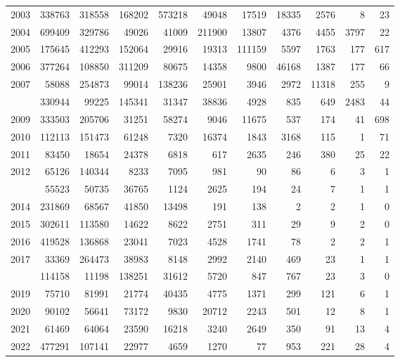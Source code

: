 \documentclass[
]{article}
\begin{document}
\begin{longtable}[t]{lrrrrrrrrrr}
2003 & 338763 & 318558 & 168202 & 573218 & 49048 & 17519 & 18335 & 2576 & 8 & 23\\
2004 & 699409 & 329786 & 49026 & 41009 & 211900 & 13807 & 4376 & 4455 & 3797 & 22\\
2005 & 175645 & 412293 & 152064 & 29916 & 19313 & 111159 & 5597 & 1763 & 177 & 617\\
2006 & 377264 & 108850 & 311209 & 80675 & 14358 & 9800 & 46168 & 1387 & 177 & 66\\
2007 & 58088 & 254873 & 99014 & 138236 & 25901 & 3946 & 2972 & 11318 & 255 & 9\\
\addlinespace
2008 & 330944 & 99225 & 145341 & 31347 & 38836 & 4928 & 835 & 649 & 2483 & 44\\
2009 & 333503 & 205706 & 31251 & 58274 & 9046 & 11675 & 537 & 174 & 41 & 698\\
2010 & 112113 & 151473 & 61248 & 7320 & 16374 & 1843 & 3168 & 115 & 1 & 71\\
2011 & 83450 & 18654 & 24378 & 6818 & 617 & 2635 & 246 & 380 & 25 & 22\\
2012 & 65126 & 140344 & 8233 & 7095 & 981 & 90 & 86 & 6 & 3 & 1\\
\addlinespace
2013 & 55523 & 50735 & 36765 & 1124 & 2625 & 194 & 24 & 7 & 1 & 1\\
2014 & 231869 & 68567 & 41850 & 13498 & 191 & 138 & 2 & 2 & 1 & 0\\
2015 & 302611 & 113580 & 14622 & 8622 & 2751 & 311 & 29 & 9 & 2 & 0\\
2016 & 419528 & 136868 & 23041 & 7023 & 4528 & 1741 & 78 & 2 & 2 & 1\\
2017 & 33369 & 264473 & 38983 & 8148 & 2992 & 2140 & 469 & 23 & 1 & 1\\
\addlinespace
2018 & 114158 & 11198 & 138251 & 31612 & 5720 & 847 & 767 & 23 & 3 & 0\\
2019 & 75710 & 81991 & 21774 & 40435 & 4775 & 1371 & 299 & 121 & 6 & 1\\
2020 & 90102 & 56641 & 73172 & 9830 & 20712 & 2243 & 501 & 12 & 8 & 1\\
2021 & 61469 & 64064 & 23590 & 16218 & 3240 & 2649 & 350 & 91 & 13 & 4\\
2022 & 477291 & 107141 & 22977 & 4659 & 1270 & 77 & 953 & 221 & 28 & 4\\*
\end{longtable}
\end{document}
